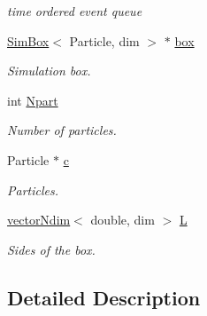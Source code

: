 \begin{CompactItemize}
\begin{CompactList}\small\item\em time ordered event queue \item\end{CompactList}\item 
\hypertarget{classEDsimul_765820a4405532d2bae2498013f4e8b8}{
\hyperlink{classSimBox}{SimBox}$<$ Particle, dim $>$ $\ast$ \hyperlink{classEDsimul_765820a4405532d2bae2498013f4e8b8}{box}}
\label{classEDsimul_765820a4405532d2bae2498013f4e8b8}

\begin{CompactList}\small\item\em Simulation box. \item\end{CompactList}\item 
\hypertarget{classEDsimul_7ba91163e0ab84a11163c680dfdfa674}{
int \hyperlink{classEDsimul_7ba91163e0ab84a11163c680dfdfa674}{Npart}}
\label{classEDsimul_7ba91163e0ab84a11163c680dfdfa674}

\begin{CompactList}\small\item\em Number of particles. \item\end{CompactList}\item 
\hypertarget{classEDsimul_edfc01e12a93afe4ee043cd4b4cf7dd3}{
Particle $\ast$ \hyperlink{classEDsimul_edfc01e12a93afe4ee043cd4b4cf7dd3}{c}}
\label{classEDsimul_edfc01e12a93afe4ee043cd4b4cf7dd3}

\begin{CompactList}\small\item\em Particles. \item\end{CompactList}\item 
\hypertarget{classEDsimul_11f9161d77d6fcd20c1948ad901746dc}{
\hyperlink{classvectorNdim}{vectorNdim}$<$ double, dim $>$ \hyperlink{classEDsimul_11f9161d77d6fcd20c1948ad901746dc}{L}}
\label{classEDsimul_11f9161d77d6fcd20c1948ad901746dc}

\begin{CompactList}\small\item\em Sides of the box. \item\end{CompactList}\end{CompactItemize}


\subsection{Detailed Description}
